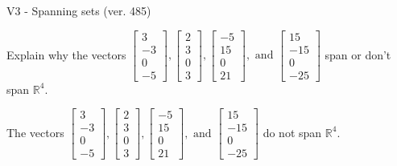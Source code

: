 \begin{exercise}
  \begin{exerciseTitle}V3 - Spanning sets (ver. 485)\end{exerciseTitle}
  \begin{exerciseStatement}
    Explain why the vectors \(\left[\begin{array}{r}
3 \\
-3 \\
0 \\
-5
\end{array}\right] , \left[\begin{array}{r}
2 \\
3 \\
0 \\
3
\end{array}\right] , \left[\begin{array}{r}
-5 \\
15 \\
0 \\
21
\end{array}\right] , \text{ and } \left[\begin{array}{r}
15 \\
-15 \\
0 \\
-25
\end{array}\right]\) span or don't span \(\mathbb{R}^4\). 
	


  \end{exerciseStatement}
  \begin{exerciseAnswer}
   The vectors \(\left[\begin{array}{r}
3 \\
-3 \\
0 \\
-5
\end{array}\right] , \left[\begin{array}{r}
2 \\
3 \\
0 \\
3
\end{array}\right] , \left[\begin{array}{r}
-5 \\
15 \\
0 \\
21
\end{array}\right] , \text{ and } \left[\begin{array}{r}
15 \\
-15 \\
0 \\
-25
\end{array}\right]\) 
  	 do not  
	span \(\mathbb{R}^4\).
  


  \end{exerciseAnswer}
\end{exercise}